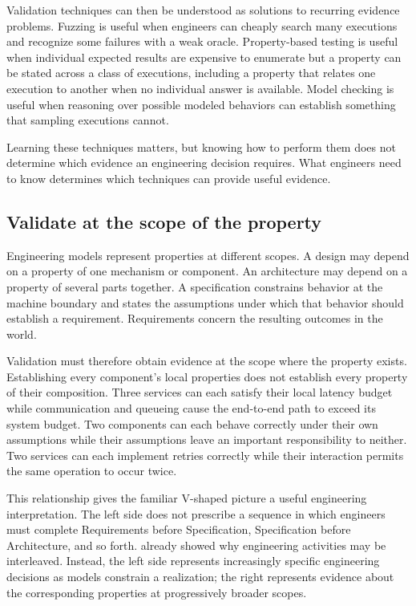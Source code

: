 Validation techniques can then be understood as solutions to recurring evidence problems. Fuzzing
is useful when engineers can cheaply search many executions and recognize some failures with a weak
oracle. Property-based testing is useful when individual expected results are expensive to
enumerate but a property can be stated across a class of executions, including a property that
relates one execution to another when no individual answer is available. Model checking is useful
when reasoning over possible modeled behaviors can establish something that sampling executions
cannot.

Learning these techniques matters, but knowing how to perform them does not determine which
evidence an engineering decision requires. What engineers need to know determines which techniques
can provide useful evidence.

\subsection{Validate at the scope of the property}\label{sec-scope-of-property}

Engineering models represent properties at different scopes. A design may depend on a property of
one mechanism or component. An architecture may depend on a property of several parts together. A
specification constrains behavior at the machine boundary and states the assumptions under which
that behavior should establish a requirement. Requirements concern the resulting outcomes in the
world.

Validation must therefore obtain evidence at the scope where the property exists. Establishing
every component's local properties does not establish every property of their composition. Three
services can each satisfy their local latency budget while communication and queueing cause the
end-to-end path to exceed its system budget. Two components can each behave correctly under their own
assumptions while their assumptions leave an important responsibility to neither. Two services can
each implement retries correctly while their interaction permits the same operation to occur twice.

This relationship gives the familiar V-shaped picture a useful engineering interpretation. The
left side does not prescribe a sequence in which engineers must complete Requirements before
Specification, Specification before Architecture, and so forth. \citet{ch-process} already showed why
engineering activities may be interleaved. Instead, the left side represents increasingly specific
engineering decisions as models constrain a realization; the right represents evidence about the
corresponding properties at progressively broader scopes.

